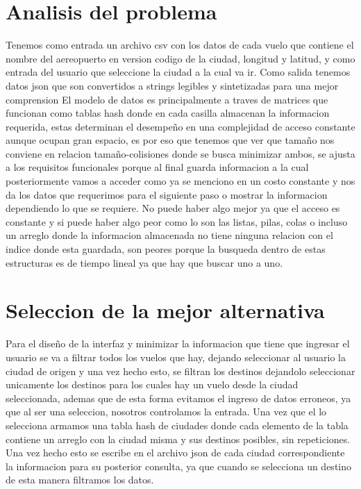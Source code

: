 \documentclass[12pt]{article}
\begin{document}
\section{Analisis del problema}
Tenemos como entrada un archivo csv con los datos de cada vuelo que contiene el nombre del aereopuerto en version codigo de la ciudad, longitud y latitud, y como entrada del usuario que seleccione la ciudad a la cual va ir.
Como salida tenemos datos json que son convertidos a strings legibles y sintetizadas para una mejor comprension
El modelo de datos es principalmente a traves de matrices que funcionan como tablas hash donde en cada casilla almacenan la informacion requerida, estas determinan el desempeño en una complejidad de acceso constante aunque ocupan gran espacio, es por eso que tenemos que ver que tamaño nos conviene en relacion tamaño-colisiones donde se busca minimizar ambos, se ajusta a los requisitos funcionales porque al final guarda informacion a la cual posteriormente vamos a acceder como ya se menciono en un costo constante y nos da los datos que requerimos para el siguiente paso o mostrar la informacion dependiendo lo que se requiere. No puede haber algo mejor ya que el acceso es constante y si puede haber algo peor como lo son las listas, pilas, colas o incluso un arreglo donde la informacion almacenada no tiene ninguna relacion con el indice donde esta guardada, son peores porque la busqueda dentro de estas estructuras es de tiempo lineal ya que hay que buscar uno a uno.
\newpage
\section{Seleccion de la mejor alternativa}
Para el diseño de la interfaz y minimizar la informacion que tiene que ingresar el usuario se va a filtrar todos los vuelos que hay, dejando seleccionar al usuario la ciudad de origen y una vez hecho esto, se filtran los destinos dejandolo seleccionar unicamente los destinos para los cuales hay un vuelo desde la ciudad seleccionada, ademas que de esta forma evitamos el ingreso de datos erroneos, ya que al ser una seleccion, nosotros controlamos la entrada. Una vez que el lo selecciona armamos una tabla hash de ciudades donde cada elemento de la tabla contiene un arreglo con la ciudad misma y sus destinos posibles, sin repeticiones. Una vez hecho esto se escribe en el archivo json de cada ciudad correspondiente la informacion para su posterior consulta, ya que cuando se selecciona un destino de esta manera filtramos los datos.
\end{document}
